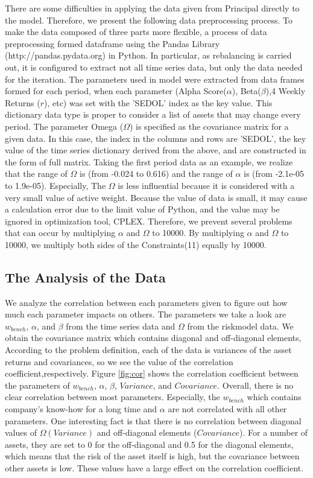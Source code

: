 \documentclass[11pt]{article}
\begin{document}
	There are some difficulties in applying the data given from Principal directly to the model. Therefore, we present the following data preprocessing process. To make the data composed of three parts more flexible, a process of data preprocessing formed dataframe using the Pandas Library (http://pandas.pydata.org) in Python. In particular, as rebalancing is carried out, it is configured to extract not all time series data, but only the data needed for the iteration. The parameters used in model were extracted from data frames formed for each period, when each parameter (Alpha Score($\alpha$), Beta($\beta$),4 Weekly Returns ($r$), etc) was set with the 'SEDOL' index as the key value. This dictionary data type is proper to consider a list of assets that may change every period. The parameter Omega ($ \Omega $) is specified as the covariance matrix for a given data. In this case, the index in the columns and rows are 'SEDOL', the key value of the time series dictionary derived from the above, and are constructed in the form of full matrix. Taking the first period data as an example, we realize that the range of $\Omega$ is (from -0.024 to 0.616) and the range of $\alpha$ is (from -2.1e-05 to 1.9e-05). Especially, The $\Omega$ is less influential because it is considered with a very small value of active weight. Because the value of data is small, it may cause a calculation error due to the limit value of Python, and the value may be ignored in optimization tool, CPLEX. Therefore, we prevent several problems that can occur by multiplying $\alpha$ and $\Omega$ to 10000. By multiplying $\alpha$ and $\Omega$ to 10000, we multiply both sides of the Constraints(11) equally by 10000. 
	
	\subsection{The Analysis of the Data}
	We analyze the correlation between each parameters given to figure out how much each parameter impacts on others. The parameters we take a look are $w_{bench}$, $\alpha$, and $\beta$ from the time series data and $\Omega$ from the riskmodel data. We obtain the covariance matrix which contains diagonal and off-diagonal elements, According to the problem definition, each of the data is variances of the asset returns and covariances, so we see the value of the correlation coefficient,respectively.  
	Figure \ref{fig:cor} shows the correlation coefficient between the parameters of $w_{bench}$, $\alpha$, $\beta$, $Variance$, and $Covariance$. Overall, there is no clear correlation between most parameters. Especially, the $w_{bench}$ which contains company's know-how for a long time and $\alpha$ are not correlated with all other parameters. One interesting fact is that there is no correlation between diagonal values of $ \Omega (Variance) $ and off-diagonal elements ($ Covariance $). For a number of assets, they are set to 0 for the off-diagonal and 0.5 for the diagonal elements, which means that the risk of the asset itself is high, but the covariance between other assets is low. These values have a large effect on the correlation coefficient.
	
\end{document}
